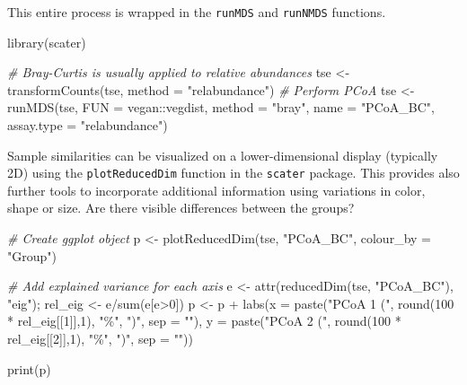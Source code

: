 \documentclass[
]{book}
\newenvironment{Shaded}{\begin{snugshade}}{\end{snugshade}}
\newcommand{\AttributeTok}[1]{\textcolor[rgb]{0.77,0.63,0.00}{#1}}
\newcommand{\CommentTok}[1]{\textcolor[rgb]{0.56,0.35,0.01}{\textit{#1}}}
\newcommand{\DecValTok}[1]{\textcolor[rgb]{0.00,0.00,0.81}{#1}}
\newcommand{\FunctionTok}[1]{\textcolor[rgb]{0.00,0.00,0.00}{#1}}
\newcommand{\NormalTok}[1]{#1}
\newcommand{\OtherTok}[1]{\textcolor[rgb]{0.56,0.35,0.01}{#1}}
\newcommand{\SpecialCharTok}[1]{\textcolor[rgb]{0.00,0.00,0.00}{#1}}
\newcommand{\StringTok}[1]{\textcolor[rgb]{0.31,0.60,0.02}{#1}}
\begin{document}
This entire process is wrapped in the \texttt{runMDS} and \texttt{runNMDS}
functions.

\begin{Shaded}
\begin{Highlighting}[]
\FunctionTok{library}\NormalTok{(scater)}

\CommentTok{\# Bray{-}Curtis is usually applied to relative abundances}
\NormalTok{tse }\OtherTok{\textless{}{-}} \FunctionTok{transformCounts}\NormalTok{(tse, }\AttributeTok{method =} \StringTok{"relabundance"}\NormalTok{)}
\CommentTok{\# Perform PCoA}
\NormalTok{tse }\OtherTok{\textless{}{-}} \FunctionTok{runMDS}\NormalTok{(tse, }\AttributeTok{FUN =}\NormalTok{ vegan}\SpecialCharTok{::}\NormalTok{vegdist, }\AttributeTok{method =} \StringTok{"bray"}\NormalTok{, }\AttributeTok{name =} \StringTok{"PCoA\_BC"}\NormalTok{, }\AttributeTok{assay.type =} \StringTok{"relabundance"}\NormalTok{)}
\end{Highlighting}
\end{Shaded}

Sample similarities can be visualized on a lower-dimensional display
(typically 2D) using the \texttt{plotReducedDim} function in the \texttt{scater}
package. This provides also further tools to incorporate additional
information using variations in color, shape or size. Are there
visible differences between the groups?

\begin{Shaded}
\begin{Highlighting}[]
\CommentTok{\# Create ggplot object}
\NormalTok{p }\OtherTok{\textless{}{-}} \FunctionTok{plotReducedDim}\NormalTok{(tse, }\StringTok{"PCoA\_BC"}\NormalTok{, }\AttributeTok{colour\_by =} \StringTok{"Group"}\NormalTok{)}

\CommentTok{\# Add explained variance for each axis}
\NormalTok{e }\OtherTok{\textless{}{-}} \FunctionTok{attr}\NormalTok{(}\FunctionTok{reducedDim}\NormalTok{(tse, }\StringTok{"PCoA\_BC"}\NormalTok{), }\StringTok{"eig"}\NormalTok{);}
\NormalTok{rel\_eig }\OtherTok{\textless{}{-}}\NormalTok{ e}\SpecialCharTok{/}\FunctionTok{sum}\NormalTok{(e[e}\SpecialCharTok{\textgreater{}}\DecValTok{0}\NormalTok{])          }
\NormalTok{p }\OtherTok{\textless{}{-}}\NormalTok{ p }\SpecialCharTok{+} \FunctionTok{labs}\NormalTok{(}\AttributeTok{x =} \FunctionTok{paste}\NormalTok{(}\StringTok{"PCoA 1 ("}\NormalTok{, }\FunctionTok{round}\NormalTok{(}\DecValTok{100} \SpecialCharTok{*}\NormalTok{ rel\_eig[[}\DecValTok{1}\NormalTok{]],}\DecValTok{1}\NormalTok{), }\StringTok{"\%"}\NormalTok{, }\StringTok{")"}\NormalTok{, }\AttributeTok{sep =} \StringTok{""}\NormalTok{),}
              \AttributeTok{y =} \FunctionTok{paste}\NormalTok{(}\StringTok{"PCoA 2 ("}\NormalTok{, }\FunctionTok{round}\NormalTok{(}\DecValTok{100} \SpecialCharTok{*}\NormalTok{ rel\_eig[[}\DecValTok{2}\NormalTok{]],}\DecValTok{1}\NormalTok{), }\StringTok{"\%"}\NormalTok{, }\StringTok{")"}\NormalTok{, }\AttributeTok{sep =} \StringTok{""}\NormalTok{))}

\FunctionTok{print}\NormalTok{(p)}
\end{Highlighting}
\end{Shaded}
\end{document}
